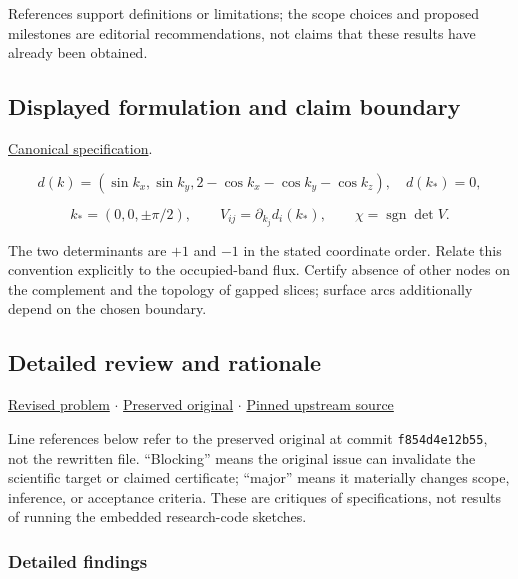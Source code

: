 \documentclass[
  11pt,
]{article}
\begin{document}
References support definitions or limitations; the scope choices and
proposed milestones are editorial recommendations, not claims that these
results have already been obtained.

\subsection{Displayed formulation and claim boundary}

\href{https://github.com/rick-stevens-ai/Pure-Thought/blob/main/PRDs/14-Topological-Semimetals-Weyl-Dirac.md}{Canonical
specification}.

\[d(k)=(\sin k_x,\sin k_y,2-\cos k_x-\cos k_y-\cos k_z),
\quad d(k_*)=0,\]

\[k_*=(0,0,\pm\pi/2),\qquad
V_{ij}=\partial_{k_j}d_i(k_*),\qquad \chi=\operatorname{sgn}\det V.\]

The two determinants are \(+1\) and \(-1\) in the stated coordinate
order. Relate this convention explicitly to the occupied-band flux.
Certify absence of other nodes on the complement and the topology of
gapped slices; surface arcs additionally depend on the chosen boundary.

\subsection{Detailed review and rationale}

\href{https://github.com/rick-stevens-ai/Pure-Thought/blob/main/PRDs/14-Topological-Semimetals-Weyl-Dirac.md}{Revised
problem} \ensuremath{\cdot}
\href{https://github.com/rick-stevens-ai/Pure-Thought/blob/main/archive/original-PRDs/14-Topological-Semimetals-Weyl-Dirac.md}{Preserved
original} \ensuremath{\cdot}
\href{https://github.com/rick-stevens-ai/Pure-Thought/blob/f854d4e12b55c1f5b5c2a964b75f2d23496d981e/PRDs/14-Topological-Semimetals-Weyl-Dirac.md}{Pinned
upstream source}

Line references below refer to the preserved original at commit
\texttt{f854d4e12b55}, not the rewritten file. ``Blocking'' means the
original issue can invalidate the scientific target or claimed
certificate; ``major'' means it materially changes scope, inference, or
acceptance criteria. These are critiques of specifications, not results
of running the embedded research-code sketches.

\subsubsection{Detailed findings}
\end{document}
